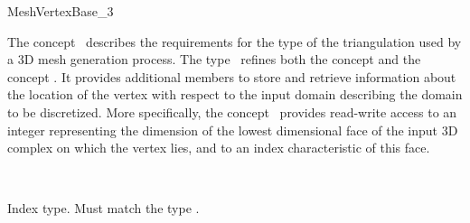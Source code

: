 \ccRefPageBegin


\begin{ccRefConcept}{MeshVertexBase_3}


\ccDefinition
  
The concept \ccRefName\ describes the  requirements 
for the  type  of the triangulation
used by a 3D mesh generation process. The type \ccRefName\
refines both the concept 
and 
 the concept .
It provides additional members  to store and retrieve
information about the location of the vertex with respect 
to the input domain describing the domain to be discretized.
More specifically, the concept \ccRefName\ provides  read-write access 
to an integer representing the dimension of the lowest dimensional face
of the input 3D complex on which the  vertex lies,
and to an index characteristic of this face.


\ccRefines
{}\\

\ccTypes

{Index type. Must match the type .}


\ccOperations

\ccGlue
{}


\end{ccRefConcept}
